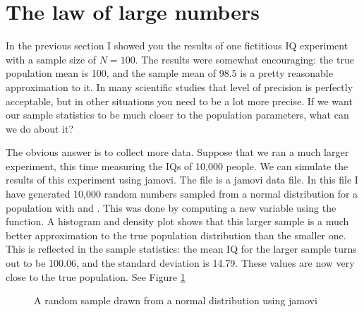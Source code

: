 \section{The law of large numbers~\label{sec:lawlargenumbers}}

In the previous section I showed you the results of one fictitious IQ experiment with a sample size of $N=100$. The results were somewhat encouraging: the true population mean is 100, and the sample mean of 98.5 is a pretty reasonable approximation to it. In many scientific studies that level of precision is perfectly acceptable, but in other situations you need to be a lot more precise. If we want our sample statistics to be much closer to the population parameters, what can we do about it?

The obvious answer is to collect more data. Suppose that we ran a much larger experiment, this time measuring the IQs of 10,000 people. We can simulate the results of this experiment using jamovi. The  file is a jamovi data file. In this file I have generated 10,000 random numbers sampled from a normal distribution for a population with  and . This was done by computing a new variable using the  function. A histogram and density plot shows that this larger sample is a much better approximation to the true population distribution than the smaller one. This is reflected in the sample statistics: the mean IQ for the larger sample turns out to be 100.06, and the standard deviation is 14.79. These values are now very close to the true population. See Figure \ref{fig:iqsim}

\begin{figure}[h]
\begin{center}
\end{center}
\caption{A random sample drawn from a normal distribution using jamovi}
\label{fig:iqsim}
\HR
\end{figure}


